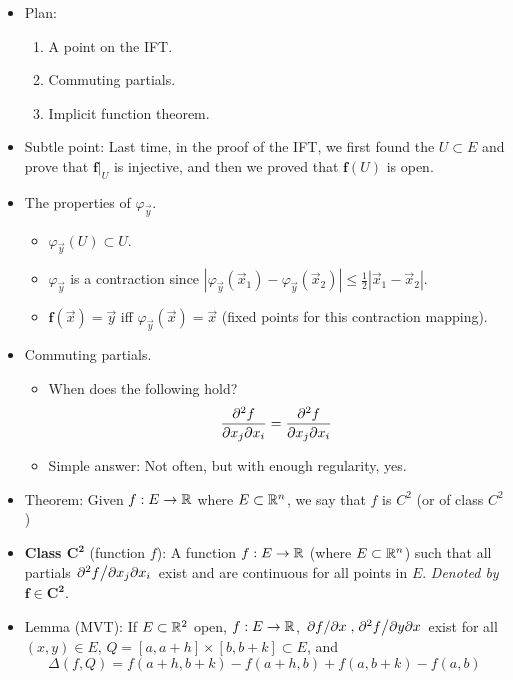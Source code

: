 \documentclass[../notes.tex]{subfiles}
\begin{document}
\begin{itemize}
    \item {}Plan:
    \begin{enumerate}
        \item A point on the IFT.
        \item Commuting partials.
        \item Implicit function theorem.
    \end{enumerate}
    \item Subtle point: Last time, in the proof of the IFT, we first found the $U\subset E$ and prove that $\mathbf{f}|_U$ is injective, and then we proved that $\mathbf{f}(U)$ is open.
    \item The properties of $\varphi_\vec{y}$.
    \begin{itemize}
        \item $\varphi_\vec{y}(U)\subset U$.
        \item $\varphi_\vec{y}$ is a contraction since $|\varphi_\vec{y}(\vec{x}_1)-\varphi_\vec{y}(\vec{x}_2)|\leq\frac{1}{2}|\vec{x}_1-\vec{x}_2|$.
        \item $\mathbf{f}(\vec{x})=\vec{y}$ iff $\varphi_\vec{y}(\vec{x})=\vec{x}$ (fixed points for this contraction mapping).
    \end{itemize}
    \item Commuting partials.
    \begin{itemize}
        \item When does the following hold?
        \begin{equation*}
            \pdv[2]{f}{x_j}{x_i} = \pdv[2]{f}{x_j}{x_i}
        \end{equation*}
        \item Simple answer: Not often, but with enough regularity, yes.
    \end{itemize}
    \item Theorem: Given $f:E\to\mathbb{R}$ where $E\subset\mathbb{R}^n$, we say that $f$ is $C^2$ (or of class $C^2$)
    \item \textbf{Class $\bm{C^2}$} (function $f$): A function $f:E\to\mathbb{R}$ (where $E\subset\mathbb{R}^n$) such that all partials $\pdv*[2]{f}{x_j}{x_i}$ exist and are continuous for all points in $E$. \emph{Denoted by} $\bm{f\in C^2}$.
    \item Lemma (MVT): If $E\subset\mathbb{R}^2$ open, $f:E\to\mathbb{R}$, $\pdv*{f}{x},\pdv*[2]{f}{y}{x}$ exist for all $(x,y)\in E$, $Q=[a,a+h]\times[b,b+k]\subset E$, and
    \begin{equation*}
        \Delta(f,Q) = f(a+h,b+k)-f(a+h,b)+f(a,b+k)-f(a,b)
    \end{equation*}

\end{itemize}
\end{document}
